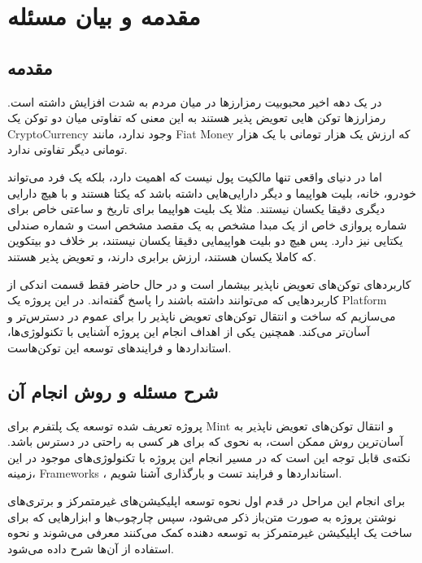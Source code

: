 
\chapter{مقدمه و بیان مسئله}

\section{مقدمه}
در یک دهه اخیر محبوبیت رمزارز‌ها در میان مردم به شدت افزایش داشته است. رمزارزها توکن هایی تعویض پذیر هستند به این معنی که تفاوتی میان دو توکن یک
\gls{CryptoCurrency}
وجود ندارد، مانند
\gls{Fiat Money}
که ارزش یک هزار تومانی با یک هزار تومانی دیگر تفاوتی ندارد.

اما در دنیای واقعی تنها مالکیت پول نیست که اهمیت دارد، بلکه یک فرد می‌تواند خودرو، خانه، بلیت هواپیما و دیگر دارایی‌هایی داشته باشد که یکتا هستند و با هیچ دارایی دیگری دقیقا یکسان نیستند. مثلا یک بلیت هواپیما برای تاریخ و ساعتی خاص برای شماره پروازی خاص از یک مبدا مشخص به یک مقصد مشخص است و شماره صندلی یکتایی نیز دارد. پس هیچ دو بلیت هواپیمایی دقیقا یکسان نیستند، بر خلاف دو بیتکوین که کاملا یکسان هستند، ارزش برابری دارند، و تعویض پذیر هستند.

کاربردهای توکن‌های تعویض ناپذیر بیشمار است و در حال حاضر فقط قسمت اندکی از کاربردهایی که می‌توانند داشته باشند را پاسخ گفته‌اند. در این پروژه یک
\gls{Platform}
می‌سازیم که ساخت و انتقال توکن‌های تعویض ناپذیر را برای عموم در دسترس‌تر و آسان‌تر می‌کند. همچنین یکی از اهداف انجام این پروژه آشنایی با تکنولوژی‌ها، استاندارد‌ها و فرایند‌های توسعه این توکن‌هاست.


\section{شرح مسئله و روش انجام آن}
پروژه تعریف شده توسعه یک پلتفرم برای
\gls{Mint}
و انتقال توکن‌های تعویض ناپذیر به آسان‌ترین روش ممکن است، به نحوی که برای هر کسی به راحتی در دسترس باشد. نکته‌ی قابل توجه‌ این است که در مسیر انجام این پروژه با تکنولوژی‌های موجود در این زمینه، 
\glspl{Framework}
، استاندارد‌ها و فرایند تست و بارگذاری آشنا شویم.

برای انجام این مراحل در قدم اول نحوه توسعه اپلیکیشن‌های غیرمتمرکز و برتری‌های نوشتن پروژه به صورت متن‌باز ذکر می‌شود، سپس چارچوب‌ها و ابزار‌هایی که برای ساخت یک اپلیکیشن غیرمتمرکز به توسعه دهنده کمک می‌کنند معرفی می‌شوند و نحوه استفاده از آن‌ها شرح داده می‌شود.

